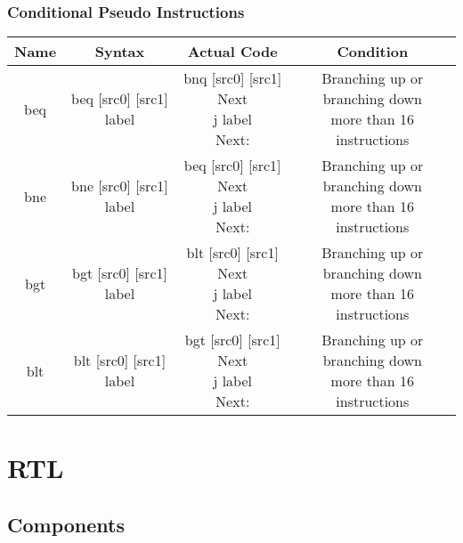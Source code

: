 \documentclass{article}
\begin{document}
		\subsubsection{Conditional Pseudo Instructions}
			\begin{center} \begin{tabular}{| c | c | c | c |} \hline
				Name & Syntax                    & Actual Code & Condition \\ \hline
				beq  & beq [src0] [src1] label & \thead{bnq [src0] [src1] Next \\ j label \\ Next:} & \thead{Branching up or branching down \\ more than 16 instructions}\\ \hline
				bne  & bne [src0] [src1] label & \thead{beq [src0] [src1] Next \\ j label \\ Next:} & \thead{Branching up or branching down \\ more than 16 instructions}\\ \hline
				bgt  & bgt [src0] [src1] label & \thead{blt [src0] [src1] Next \\ j label \\ Next:} & \thead{Branching up or branching down \\ more than 16 instructions}\\ \hline
				blt  & blt [src0] [src1] label & \thead{bgt [src0] [src1] Next \\ j label \\ Next:} & \thead{Branching up or branching down \\ more than 16 instructions}\\ \hline
			\end{tabular} \end{center}
\section{RTL}
	\subsection{Components}
\end{document}
